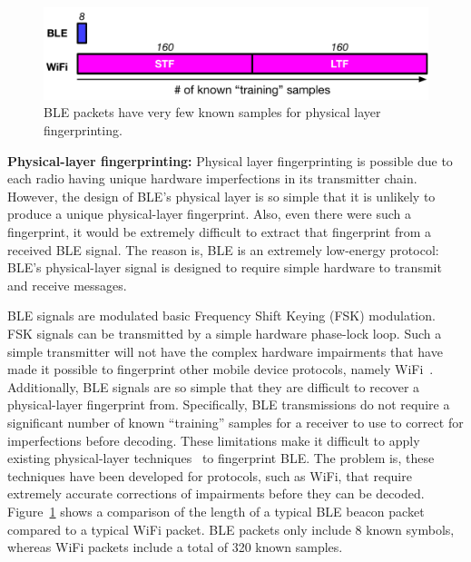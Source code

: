 \begin{figure}
    \centering
    \includegraphics[width=\linewidth]{bletracking/plots/knownsamples}
    \caption{
      BLE packets have very few known samples for physical layer fingerprinting.
    \label{fig:2}
  }
\end{figure}

\vspace{0.5em} \noindent\textbf{Physical-layer fingerprinting:}
%
Physical layer fingerprinting is possible due to each radio having unique
hardware imperfections in its transmitter chain.
%
However, the design of BLE's physical layer is so simple that it is unlikely to
produce a unique physical-layer fingerprint. Also, even there were such a
fingerprint, it would be extremely difficult to extract that fingerprint from a
received BLE signal.
%
The reason is, BLE is an extremely low-energy protocol: BLE's physical-layer
signal is designed to require simple hardware to transmit and receive messages.
 
BLE signals are modulated basic Frequency Shift Keying (FSK) modulation. FSK
signals can be transmitted by a simple hardware phase-lock loop.
%
Such a simple transmitter will not have the complex hardware
impairments that have made it possible to fingerprint other mobile device protocols, namely WiFi~\cite{
vohuuusrp,
Brik_radiometric,
deviceID_kose}.
%
%
Additionally, BLE signals are so simple that they are difficult to recover a physical-layer fingerprint from.
%
%
Specifically, BLE transmissions do not require a significant number of known ``training''
samples for a receiver to use to correct for imperfections before decoding.
%  
These limitations make it difficult to apply existing physical-layer techniques~\cite{
vohuuusrp,
Brik_radiometric,
deviceID_kose,
Intrusion_hall,
suskitransient,
deeplearning_merchant,
lora_robyns,
gopalakrishnan2019robust}
to fingerprint BLE.
%
The problem is, these techniques have been developed for protocols, such as
WiFi, that require extremely accurate
corrections of impairments before they can be decoded.
%
%
Figure~\ref{fig:2} shows a comparison of the length of a typical
BLE beacon packet compared to a typical WiFi packet.
%
BLE packets only include 8 known symbols, whereas WiFi packets include 
a total of 320 known samples.

